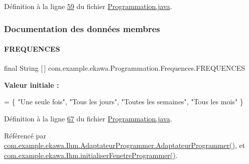 Définition à la ligne \hyperlink{_programmation_8java_source_l00059}{59} du fichier \hyperlink{_programmation_8java_source}{Programmation.\+java}.



\subsubsection{Documentation des données membres}
\mbox{\label{classcom_1_1example_1_1ekawa_1_1_programmation_1_1_frequences_afdc0109428ca2cc827cff55b8427cd50}} 
\paragraph{\texorpdfstring{F\+R\+E\+Q\+U\+E\+N\+C\+ES}{FREQUENCES}}
{\footnotesize\ttfamily final String \mbox{[}$\,$\mbox{]} com.\+example.\+ekawa.\+Programmation.\+Frequences.\+F\+R\+E\+Q\+U\+E\+N\+C\+ES\hspace{0.3cm}{\ttfamily [static]}}

{\bfseries Valeur initiale \+:}
\begin{DoxyCode}
=
        \{
            \textcolor{stringliteral}{"Une seule fois"},
            \textcolor{stringliteral}{"Tous les jours"},
            \textcolor{stringliteral}{"Toutes les semaines"},
            \textcolor{stringliteral}{"Tous les mois"}
        \}
\end{DoxyCode}


Définition à la ligne \hyperlink{_programmation_8java_source_l00067}{67} du fichier \hyperlink{_programmation_8java_source}{Programmation.\+java}.



Référencé par \hyperlink{_ihm_8java_source_l00190}{com.\+example.\+ekawa.\+Ihm.\+Adaptateur\+Programmer.\+Adaptateur\+Programmer()}, et \hyperlink{_ihm_8java_source_l00727}{com.\+example.\+ekawa.\+Ihm.\+initialiser\+Fenetre\+Programmer()}.

\mbox{\label{classcom_1_1example_1_1ekawa_1_1_programmation_1_1_frequences_a92b76aab3e8479b140194ab329a0f3de}} 

